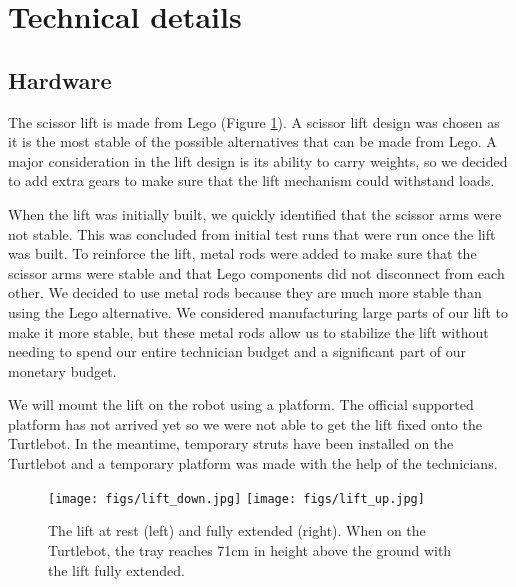 \documentclass{article}
\begin{document}
\section{Technical details}
\subsection{Hardware}
\par The scissor lift is made from Lego (Figure \ref{fig:lift}). A scissor lift design was chosen as it is the most stable of the possible alternatives that can be made from Lego. A major consideration in the lift design is its ability to carry weights, so we decided to add extra gears to make sure that the lift mechanism could withstand loads. 
\par When the lift was initially built, we quickly identified that the scissor arms were not stable. This was concluded from initial test runs that were run once the lift was built. To reinforce the lift, metal rods were added to make sure that the scissor arms were stable and that Lego components did not disconnect from each other. We decided to use metal rods because they are much more stable than using the Lego alternative. We considered manufacturing large parts of our lift to make it more stable, but these metal rods allow us to stabilize the lift without needing to spend our entire technician budget and a significant part of our monetary budget. 
\par We will mount the lift on the robot using a platform. The official supported platform has not arrived yet so we were not able to get the lift fixed onto the Turtlebot. In the meantime, temporary struts have been installed on the Turtlebot and a temporary platform was made with the help of the technicians.

\begin{figure}
  \begin{center}
    \texttt{[image: figs/lift\_down.jpg]}
    \texttt{[image: figs/lift\_up.jpg]}
    \caption{The lift at rest (left) and fully extended (right). When on the Turtlebot, the tray reaches 71cm in height above the ground with the lift fully extended.}
  \label{fig:lift}
  \end{center}
\end{figure}
\end{document}
